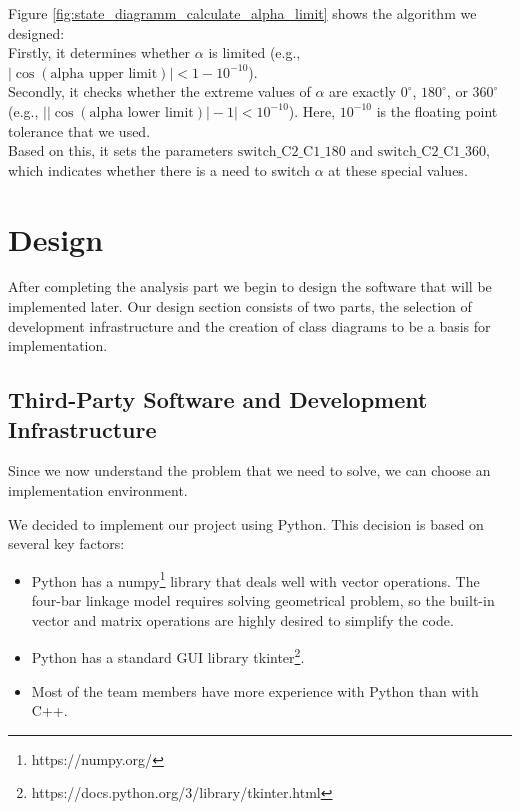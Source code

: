 \documentclass{article}
\begin{document}
\begin{itemize}
	Figure \ref{fig:state_diagramm_calculate_alpha_limit} shows the algorithm we designed:\\
	Firstly, it determines whether \(\alpha\) is limited (e.g., \(|\cos(\text{alpha upper limit})| < 1 - 10^{-10}\)).\\
	Secondly, it checks whether the extreme values of \(\alpha\) are exactly \(0^\circ\), \(180^\circ\), or \(360^\circ\) (e.g., \(\bigl|\bigl| \cos(\text{alpha lower limit}) \bigr| - 1 \bigr| < 10^{-10}\)). Here, \(10^{-10}\) is the floating point tolerance that we used.\\
	Based on this, it sets the parameters \(\text{switch\_C2\_C1\_180}\) and \(\text{switch\_C2\_C1\_360}\), which indicates whether there is a need to switch \(\alpha\) at these special values.

\end{itemize}



\section{Design} \label{ch:design}

After completing the analysis part we begin to design the software that will be implemented later. Our design section consists of two parts, the selection of development infrastructure and the creation of class diagrams to be a basis for implementation.

\subsection{Third-Party Software and Development Infrastructure}

Since we now understand the problem that we need to solve, we can choose an implementation environment.

We decided to implement our project using Python. This decision is based on several key factors:
\begin{itemize}
	\item Python has a numpy\footnote{\label{fn:numpy} https://numpy.org/} library that deals well with vector operations. The four-bar linkage model requires solving geometrical problem, so the built-in vector and matrix operations are highly desired to simplify the code.
	\item Python has a standard GUI library tkinter\footnote{\label{fn:tkinter} https://docs.python.org/3/library/tkinter.html}.
	\item Most of the team members have more experience with Python than with C++.
\end{itemize}
\end{document}
